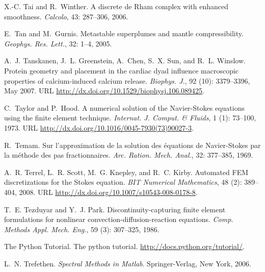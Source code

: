 \begin{thebibliography}{467}
X.-C. Tai and R.~Winther.
\newblock A discrete de {R}ham complex with enhanced smoothness.
\newblock \emph{Calcolo}, 43: 287--306, 2006.

E.~Tan and M.~Gurnis.
\newblock Metastable superplumes and mantle compressibility.
\newblock \emph{Geophys. Res. Lett.}, 32: 1--4, 2005.

A.~J. Tanskanen, J.~L. Greenstein, A.~Chen, S.~X. Sun, and R.~L. Winslow.
\newblock Protein geometry and placement in the cardiac dyad influence
  macroscopic properties of calcium-induced calcium release.
\newblock \emph{Biophys. J.}, 92 (10): 3379--3396, May 2007.
\newblock URL \url{http://dx.doi.org/10.1529/biophysj.106.089425}.

C.~Taylor and P.~Hood.
\newblock A numerical solution of the {N}avier-{S}tokes equations using the
  finite element technique.
\newblock \emph{Internat. J. Comput. \& Fluids}, 1 (1):
  73--100, 1973.
\newblock URL \url{http://dx.doi.org/10.1016/0045-7930(73)90027-3}.

R.~Temam.
\newblock Sur l'approximation de la solution des {\'{e}}quations de
  {N}avier-{S}tokes par la m{\'{e}}thode des pas fractionnaires.
\newblock \emph{Arc. Ration. Mech. Anal.}, 32: 377--385, 1969.

A.~R. Terrel, L.~R. Scott, M.~G. Knepley, and R.~C. Kirby.
\newblock Automated {FEM} discretizations for the {S}tokes equation.
\newblock \emph{BIT Numerical Mathematics}, 48 (2): 389--404,
  2008.
\newblock URL \url{http://dx.doi.org/10.1007/s10543-008-0178-8}.

T.~E. Tezduyar and Y.~J. Park.
\newblock Discontinuity-capturing finite element formulations for nonlinear
  convection-diffusion-reaction equations.
\newblock \emph{Comp. Methods Appl. Mech. Eng.}, 59 (3):
  307--325, 1986.

The Python Tutorial.
\newblock The python tutorial.
\newblock \url{http://docs.python.org/tutorial/}.

L.~N. Trefethen.
\newblock \emph{Spectral Methods in Matlab}.
\newblock Springer-Verlag, New York, 2006.


\end{thebibliography}
